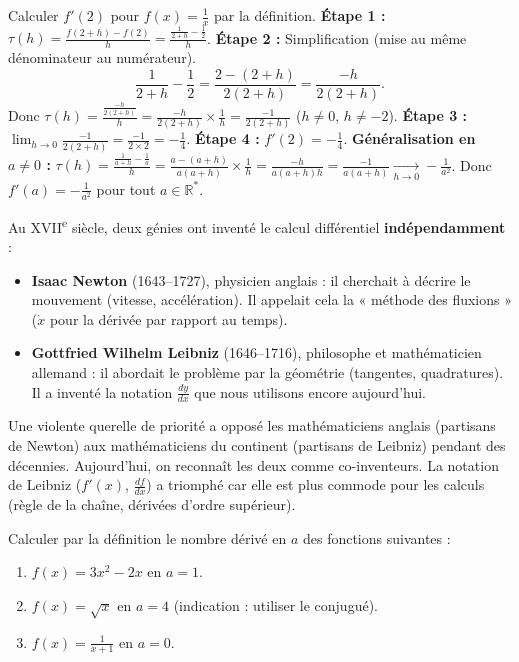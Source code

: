 \documentclass[11pt]{article}
\begin{document}
\begin{exoresolu}[Dérivé de $f(x)=\frac{1}{x}$ en $a=2$ (puis en $a \neq 0$)]
Calculer $f'(2)$ pour $f(x)=\frac{1}{x}$ par la définition.
\tcblower
\textbf{Étape 1 :} $\tau(h) = \frac{f(2+h)-f(2)}{h} = \frac{\frac{1}{2+h} - \frac{1}{2}}{h}$.
\textbf{Étape 2 :} Simplification (mise au même dénominateur au numérateur).
\[
\frac{1}{2+h} - \frac{1}{2} = \frac{2 - (2+h)}{2(2+h)} = \frac{-h}{2(2+h)}.
\]
Donc $\tau(h) = \frac{\frac{-h}{2(2+h)}}{h} = \frac{-h}{2(2+h)} \times \frac{1}{h} = \frac{-1}{2(2+h)}$ \quad ($h \neq 0$, $h \neq -2$).
\textbf{Étape 3 :} $\lim_{h\to 0} \frac{-1}{2(2+h)} = \frac{-1}{2\times 2} = -\frac{1}{4}$.
\textbf{Étape 4 :} $f'(2) = -\frac{1}{4}$.
\medskip
\noindent \textbf{Généralisation en $a \neq 0$ :}
$\tau(h) = \frac{\frac{1}{a+h}-\frac{1}{a}}{h} = \frac{a-(a+h)}{a(a+h)} \times \frac{1}{h} = \frac{-h}{a(a+h)h} = \frac{-1}{a(a+h)} \xrightarrow[h\to0]{} -\frac{1}{a^2}$.
Donc \textbf{$f'(a) = -\frac{1}{a^2}$} pour tout $a \in \mathbb{R}^*$.
\end{exoresolu}

\begin{savaistu}
Au XVII\textsuperscript{e} siècle, deux génies ont inventé le calcul différentiel \textbf{indépendamment} :
\begin{itemize}
    \item \textbf{Isaac Newton} (1643--1727), physicien anglais : il cherchait à décrire le mouvement (vitesse, accélération). Il appelait cela la « méthode des fluxions » ($\dot{x}$ pour la dérivée par rapport au temps).
    \item \textbf{Gottfried Wilhelm Leibniz} (1646--1716), philosophe et mathématicien allemand : il abordait le problème par la géométrie (tangentes, quadratures). Il a inventé la notation $\frac{dy}{dx}$ que nous utilisons encore aujourd'hui.
\end{itemize}
Une violente querelle de priorité a opposé les mathématiciens anglais (partisans de Newton) aux mathématiciens du continent (partisans de Leibniz) pendant des décennies. Aujourd'hui, on reconnaît les deux comme co-inventeurs. La notation de Leibniz ($f'(x)$, $\frac{df}{dx}$) a triomphé car elle est plus commode pour les calculs (règle de la chaîne, dérivées d'ordre supérieur).
\end{savaistu}

\begin{exercice}
Calculer par la définition le nombre dérivé en $a$ des fonctions suivantes :
\begin{enumerate}
    \item $f(x) = 3x^2 - 2x$ en $a = 1$.
    \item $f(x) = \sqrt{x}$ en $a = 4$ (indication : utiliser le conjugué).
    \item $f(x) = \frac{1}{x+1}$ en $a = 0$.
\end{enumerate}
\end{exercice}
\end{document}

